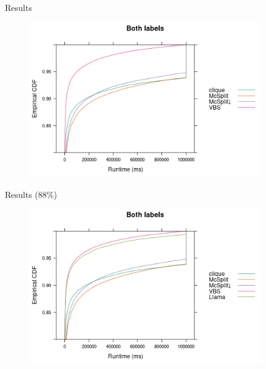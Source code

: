 \documentclass{beamer}
\begin{document}
\begin{frame}{Results}
  \begin{figure}
    \centering
    \includegraphics[width=0.9\textwidth]{../dissertation/images/ecdf_both_labels.png}
  \end{figure}
\end{frame}

\begin{frame}{Results (88\%)}
  \begin{figure}
    \centering
    \includegraphics[width=0.9\textwidth]{../dissertation/images/ecdf_both_labels_llama.png}
  \end{figure}
\end{frame}

\end{document}
